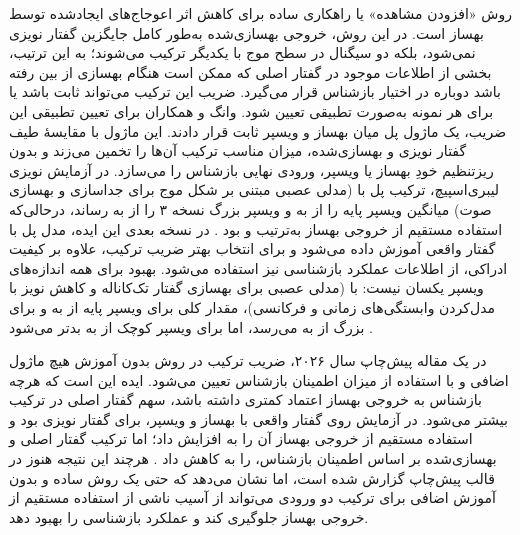 روش «افزودن مشاهده» یا  راهکاری ساده برای کاهش اثر اعوجاج‌های ایجادشده توسط بهساز است. در این روش، خروجی بهسازی‌شده به‌طور کامل جایگزین گفتار نویزی نمی‌شود، بلکه دو سیگنال در سطح موج با یکدیگر ترکیب می‌شوند؛ به این ترتیب، بخشی از اطلاعات موجود در گفتار اصلی که ممکن است هنگام بهسازی از بین رفته باشد دوباره در اختیار بازشناس قرار می‌گیرد. ضریب این ترکیب می‌تواند ثابت باشد یا برای هر نمونه به‌صورت تطبیقی تعیین شود. وانگ و همکاران برای تعیین تطبیقی این ضریب، یک ماژول پل میان بهساز و ویسپر ثابت قرار دادند. این ماژول با مقایسهٔ طیف گفتار نویزی و بهسازی‌شده، میزان مناسب ترکیب آن‌ها را تخمین می‌زند و بدون ریزتنظیم خودِ بهساز یا ویسپر، ورودی نهایی بازشناس را می‌سازد. در آزمایش نویزی لیبری‌اسپیچ، ترکیب پل با  (مدلی عصبی مبتنی بر شکل موج برای جداسازی و بهسازی صوت) میانگین  ویسپر پایه را از  به  و ویسپر بزرگ نسخه ۳ را از  به  رساند، درحالی‌که استفاده مستقیم از خروجی بهساز به‌ترتیب  و  بود . در نسخه بعدی این ایده، مدل پل با گفتار واقعی  آموزش داده می‌شود و برای انتخاب بهتر ضریب ترکیب، علاوه بر کیفیت ادراکی، از اطلاعات عملکرد بازشناسی نیز استفاده می‌شود. بهبود برای همه اندازه‌های ویسپر یکسان نیست: با  (مدلی عصبی برای بهسازی گفتار تک‌کاناله و کاهش نویز با مدل‌کردن وابستگی‌های زمانی و فرکانسی)، مقدار کلی برای ویسپر پایه از  به  و برای بزرگ از  به  می‌رسد، اما برای ویسپر کوچک از  به  بدتر می‌شود .

در یک مقاله پیش‌چاپ سال ۲۰۲۶، ضریب ترکیب در روش  بدون آموزش هیچ ماژول اضافی و با استفاده از میزان اطمینان بازشناس تعیین می‌شود. ایده این است که هرچه بازشناس به خروجی بهساز اعتماد کمتری داشته باشد، سهم گفتار اصلی در ترکیب بیشتر ‌می‌شود. در آزمایش روی گفتار واقعی  با بهساز  و ویسپر،  برای گفتار نویزی  بود و استفاده مستقیم از خروجی بهساز آن را به  افزایش داد؛ اما ترکیب گفتار اصلی و بهسازی‌شده بر اساس اطمینان بازشناس،  را به  کاهش داد . هرچند این نتیجه هنوز در قالب پیش‌چاپ گزارش شده است، اما نشان می‌دهد که حتی یک روش ساده و بدون آموزش اضافی برای ترکیب دو ورودی می‌تواند از آسیب ناشی از استفاده مستقیم از خروجی بهساز جلوگیری کند و عملکرد بازشناسی را بهبود دهد.



